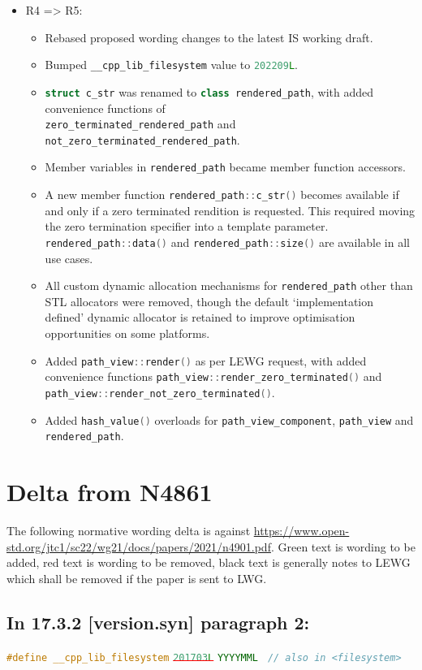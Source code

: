\documentclass[11pt]{article}
\newcommand{\code}[2][cpp]{\lstinline[language=#1,basicstyle=\small\ttfamily]{#2}}
\newcommand{\tsrefp}[3]{\subsection*{In #2 \textbf{[#1]} paragraph #3:}}
\newcommand{\tsreplace}[3]{\textcolor{red}{\sout{#1}}#2\textcolor{darkgreen}{#3}}
\begin{document}
\begin{itemize}
    \item R4 => R5:
    \begin{itemize}
        \item Rebased proposed wording changes to the latest IS working draft.
        \item Bumped \code{__cpp_lib_filesystem} value to \code{202209L}.
        \item \code{struct c_str} was renamed to \code{class rendered_path}, with added convenience functions of \\
        \code{zero_terminated_rendered_path} and \code{not_zero_terminated_rendered_path}.
        \item Member variables in \code{rendered_path} became member function accessors.
        \item A new member function \code{rendered_path::c_str()} becomes available if and only if a zero terminated rendition is requested. This required moving the zero termination specifier into a template parameter. \code{rendered_path::data()} and \code{rendered_path::size()} are available in all use cases.
        \item All custom dynamic allocation mechanisms for \code{rendered_path} other than STL allocators were removed, though the default `implementation defined' dynamic allocator is retained to improve optimisation opportunities on some platforms.
        \item Added \code{path_view::render()} as per LEWG request, with added convenience functions \code{path_view::render_zero_terminated()} and \code{path_view::render_not_zero_terminated()}.
        \item Added \code{hash_value()} overloads for \code{path_view_component}, \code{path_view} and \code{rendered_path}.
    \end{itemize}
\end{itemize}

\section{Delta from N4861}

The following normative wording delta is against \url{https://www.open-std.org/jtc1/sc22/wg21/docs/papers/2021/n4901.pdf}. Green text is wording to be added, red text is wording to be removed, black text is generally notes to LEWG which shall be removed if the paper is sent to LWG.

\tsrefp{version.syn}{17.3.2}{2}

\code{#define __cpp_lib_filesystem}
\tsreplace{\code{201703L}}{ }{\code{YYYYMML}}
\code{ // also in <filesystem>}
\end{document}
